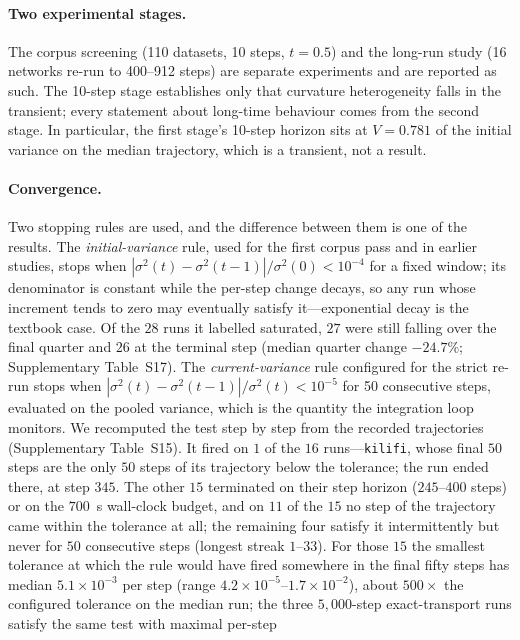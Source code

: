 \documentclass[11pt]{article}
\begin{document}
\paragraph{Two experimental stages.} The corpus screening (110 datasets,
10 steps, $t=0.5$) and the long-run study (16 networks re-run to
400--912 steps) are separate experiments and are reported as such. The
10-step stage establishes only that curvature heterogeneity falls in the
transient; every statement about long-time behaviour comes from the second
stage. In particular, the first stage's 10-step horizon sits at $V=0.781$ of
the initial variance on the median trajectory, which is a transient, not a
result.

\paragraph{Convergence.} Two stopping rules are used, and the difference
between them is one of the results. The \emph{initial-variance} rule, used for
the first corpus pass and in earlier studies, stops when
$|\sigma^2(t)-\sigma^2(t-1)|/\sigma^2(0) < 10^{-4}$ for a fixed window;
its denominator is constant while the per-step change decays, so any run
whose increment tends to zero may eventually satisfy it---exponential decay is
the textbook case. Of the $28$ runs it labelled saturated, $27$ were still
falling over the final quarter and $26$ at the terminal step (median quarter
change $-24.7\%$; Supplementary Table~S17).
The \emph{current-variance} rule configured for the strict re-run stops when
$|\sigma^2(t)-\sigma^2(t-1)|/\sigma^2(t) < 10^{-5}$ for 50 consecutive steps,
evaluated on the pooled variance, which is the quantity the integration loop
monitors. We recomputed the test step by step from the recorded trajectories
(Supplementary Table~S15). It fired on $1$ of the $16$ runs---\texttt{kilifi}, whose
final $50$ steps are the only $50$ steps of its trajectory below the
tolerance; the run ended there, at step $345$. The other $15$ terminated on
their step horizon ($245$--$400$ steps) or on the $700$~s wall-clock budget, and
on $11$ of the $15$ no step of the trajectory came within the tolerance at all;
the remaining four satisfy it intermittently but never for $50$ consecutive
steps (longest streak $1$--$33$). For those $15$ the smallest tolerance at which
the rule would have fired somewhere in the final fifty steps has median
$5.1\times10^{-3}$ per step (range $4.2\times10^{-5}$--$1.7\times10^{-2}$),
about $500\times$ the configured tolerance on the median run; the three
$5{,}000$-step exact-transport runs satisfy the same test with maximal per-step
\end{document}

